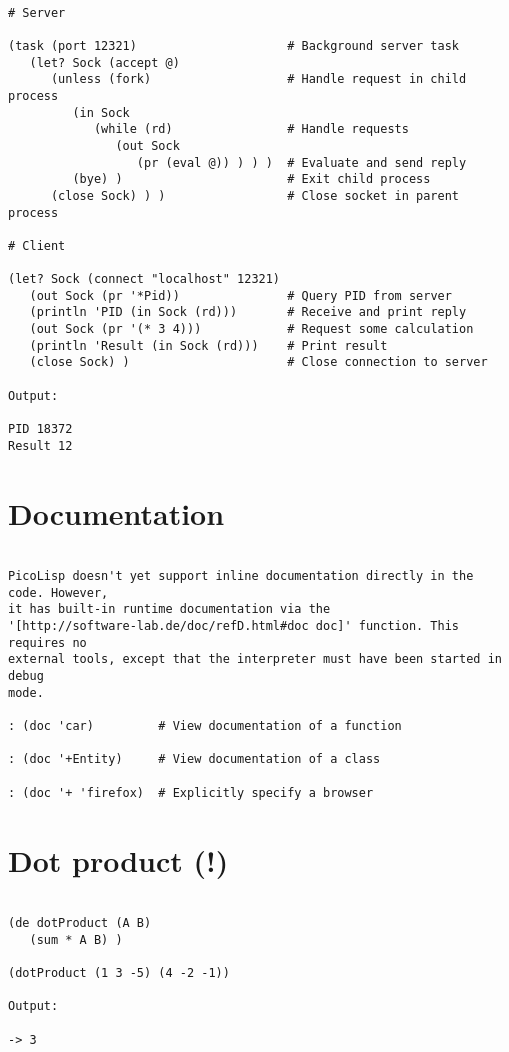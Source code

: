 \begin{verbatim}

# Server

(task (port 12321)                     # Background server task
   (let? Sock (accept @)
      (unless (fork)                   # Handle request in child process
         (in Sock
            (while (rd)                # Handle requests
               (out Sock
                  (pr (eval @)) ) ) )  # Evaluate and send reply
         (bye) )                       # Exit child process
      (close Sock) ) )                 # Close socket in parent process

# Client

(let? Sock (connect "localhost" 12321)
   (out Sock (pr '*Pid))               # Query PID from server
   (println 'PID (in Sock (rd)))       # Receive and print reply
   (out Sock (pr '(* 3 4)))            # Request some calculation
   (println 'Result (in Sock (rd)))    # Print result
   (close Sock) )                      # Close connection to server

Output:

PID 18372
Result 12

\end{verbatim}

\section*{Documentation}

\begin{verbatim}

PicoLisp doesn't yet support inline documentation directly in the code. However,
it has built-in runtime documentation via the
'[http://software-lab.de/doc/refD.html#doc doc]' function. This requires no
external tools, except that the interpreter must have been started in debug
mode.

: (doc 'car)         # View documentation of a function

: (doc '+Entity)     # View documentation of a class

: (doc '+ 'firefox)  # Explicitly specify a browser

\end{verbatim}

\section*{Dot product (!)}

\begin{verbatim}

(de dotProduct (A B)
   (sum * A B) )

(dotProduct (1 3 -5) (4 -2 -1))

Output:

-> 3

\end{verbatim}

